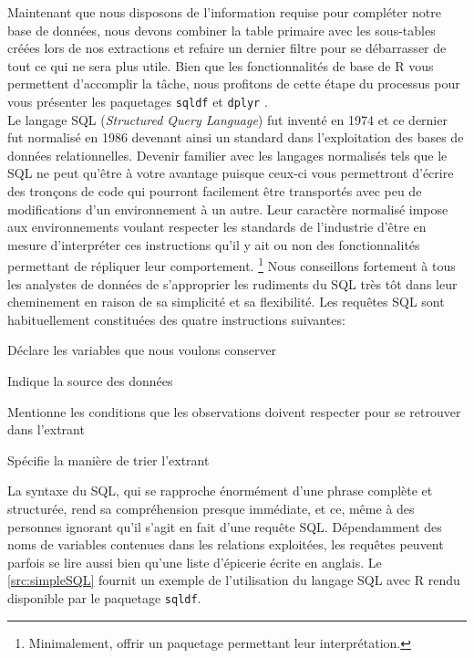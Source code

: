 \vspace{\baselineskip}
Maintenant que nous disposons de l'information requise pour compléter notre base de données, nous devons combiner la table primaire avec les sous-tables créées lors de nos extractions et refaire un dernier filtre pour se débarrasser de tout ce qui ne sera plus utile. Bien que les fonctionnalités de base de R vous permettent d'accomplir la tâche, nous profitons de cette étape du processus pour vous présenter les paquetages \texttt{sqldf} \cite{Rpackage:sqldf} et \texttt{dplyr} \cite{Rpackage:plyr}. \\

Le langage SQL (\emph{Structured Query Language}) fut inventé en 1974 et ce dernier fut normalisé en 1986 devenant ainsi un standard dans l'exploitation des bases de données relationnelles. Devenir familier avec les langages normalisés tels que le SQL ne peut qu'être à votre avantage puisque ceux-ci vous permettront d'écrire des tronçons de code qui pourront facilement être transportés avec peu de modifications d'un environnement à un autre. Leur caractère normalisé impose aux environnements voulant respecter les standards de l'industrie d'être en mesure d'interpréter ces instructions qu'il y ait ou non des fonctionnalités permettant de répliquer leur comportement. \footnote{Minimalement, offrir un paquetage permettant leur interprétation.} \cite{SQL} Nous conseillons fortement à tous les analystes de données de s'approprier les rudiments du SQL très tôt dans leur cheminement en raison de sa simplicité et sa flexibilité. Les requêtes SQL sont habituellement constituées des quatre instructions suivantes: \\

\begin{description}[style=multiline,leftmargin=2cm]
	\item[Select] Déclare les variables que nous voulons conserver
	\item[From] Indique la source des données
	\item[Where] Mentionne les conditions que les observations doivent respecter pour se retrouver dans l'extrant
	\item[Order by] Spécifie la manière de trier l'extrant
\end{description}

La syntaxe du SQL, qui se rapproche énormément d'une phrase complète et structurée, rend sa compréhension presque immédiate, et ce, même à des personnes ignorant qu'il s'agit en fait d'une requête SQL. Dépendamment des noms de variables contenues dans les relations exploitées, les requêtes peuvent parfois se lire aussi bien qu'une liste d'épicerie écrite en anglais. Le \autoref{src:simpleSQL} fournit un exemple de l'utilisation du langage SQL avec R rendu disponible par le paquetage \texttt{sqldf}.

